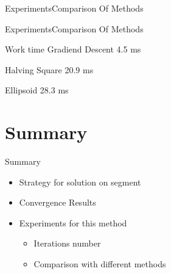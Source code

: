 \documentclass{beamer}
\begin{document}
\begin{frame}{Experiments}{Comparison Of Methods}

\begin{figure}[h!]
\label{fig:image}
\end{figure}

\end{frame}

\begin{frame}{Experiments}{Comparison Of Methods}

\begin{block}{Work time}
Gradiend Descent 4.5 ms

Halving Square 20.9 ms

Ellipsoid 28.3 ms
\end{block}
\end{frame}

\section*{Summary}

\begin{frame}{Summary}
  \begin{itemize}
  \item
    Strategy for solution on segment
  \item
    Convergence Results
  \item
    Experiments for this method
        \begin{itemize}
    \item
      Iterations number
    \item
      Comparison with different methods
    \end{itemize}
  \end{itemize}
\end{frame}
\end{document}
